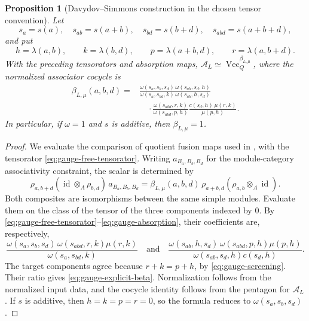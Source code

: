 \documentclass[12pt]{amsart}
\numberwithin{equation}{section}
\newtheorem{prop}[theorem]{Proposition}
\theoremstyle{definition}
\begin{document}
\begin{prop}[Davydov--Simmons construction in the chosen tensor convention]
\label{prop:boundary-associator}
Let
$$
s_a=s(a),\quad s_{ab}=s(a+b),\quad
s_{bd}=s(b+d),\quad s_{abd}=s(a+b+d),
$$
and put
$$
h=\lambda(a,b),\qquad k=\lambda(b,d),\qquad
p=\lambda(a+b,d),\qquad r=\lambda(a,b+d).
$$
With the preceding tensorators and absorption maps,
$\mathcal A_L\simeq\operatorname{Vec}_{Q}^{\beta_{L,\mu}}$,
where the normalized associator cocycle is
\begin{equation}
\label{eq:gauge-explicit-beta}
\begin{aligned}
\beta_{L,\mu}(a,b,d)
={}&
\frac{\omega(s_a,s_b,s_d)\,\omega(s_{ab},s_d,h)}
{\omega(s_a,s_{bd},k)\,\omega(s_{ab},h,s_d)}
\\[1mm]
&\quad{}\cdot
\frac{\omega(s_{abd},r,k)}{\omega(s_{abd},p,h)}
\frac{c(s_d,h)\,\mu(r,k)}{\mu(p,h)}.
\end{aligned}
\end{equation}
In particular, if $\omega=1$ and $s$ is additive, then
$\beta_{L,\mu}=1$.
\end{prop}

\begin{proof}
We evaluate the comparison of quotient fusion maps used in
\cite[Appendix~A]{DavydovSimmons2018}, with the tensorator
\eqref{eq:gauge-free-tensorator}.
Writing $a_{B_a,B_b,B_d}$ for the module-category associativity
constraint, the scalar is determined by
$$
\rho_{a,b+d}
(\operatorname{id}\otimes_A\rho_{b,d})
\,a_{B_a,B_b,B_d}
=
\beta_{L,\mu}(a,b,d)\,
\rho_{a+b,d}
(\rho_{a,b}\otimes_A\operatorname{id}).
$$
Both composites are isomorphisms between the same simple modules.
Evaluate them on the class of the tensor of the three components
indexed by $0$. By
\eqref{eq:gauge-free-tensorator}--\eqref{eq:gauge-absorption},
their coefficients are, respectively,
$$
\frac{\omega(s_a,s_b,s_d)\,
      \omega(s_{abd},r,k)\mu(r,k)}
     {\omega(s_a,s_{bd},k)}
\quad\text{and}\quad
\frac{\omega(s_{ab},h,s_d)\,
      \omega(s_{abd},p,h)\mu(p,h)}
     {\omega(s_{ab},s_d,h)c(s_d,h)}.
$$
The target components agree because $r+k=p+h$, by
\eqref{eq:gauge-screening}. Their ratio gives
\eqref{eq:gauge-explicit-beta}.
Normalization follows from the normalized input data, and the
cocycle identity follows from the pentagon for $\mathcal A_L$.
If $s$ is additive, then $h=k=p=r=0$, so the formula reduces
to $\omega(s_a,s_b,s_d)$.
\end{proof}
\end{document}
